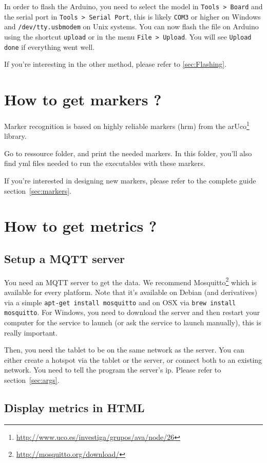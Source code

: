 \documentclass[a4paper,11pt]{report}
\begin{document}
In order to flash the Arduino, you need to select the model in \texttt{Tools >
Board} and the serial port in \texttt{Tools > Serial Port}, this is likely
\texttt{COM3} or higher on Windows and \texttt{/dev/tty.usbmodem} on Unix systems.
You can now flash the file on Arduino using the shortcut \texttt{upload} or in
the menu \texttt{File > Upload}. You will see \texttt{Upload done} if everything
went well.

If you're interesting in the other method, please refer to \ref{sec:Flashing}.

\section{How to get markers ?}

Marker recognition is based on highly reliable markers (hrm) from the
arUco\footnote{\url{http://www.uco.es/investiga/grupos/ava/node/26}}
library.

Go to ressource folder, and print the needed markers. In this folder, you'll
also find yml files needed to run the executables with these markers.

If you're interested in designing new markers, please refer to the complete guide
section~\ref{sec:markers}.

\section{How to get metrics ?}

\subsection{Setup a MQTT server}

You need an MQTT server to get the data. We recommend
Mosquitto\footnote{\url{http://mosquitto.org/download/}} which is available for
every platform. Note that it's available on Debian (and derivatives) via a
simple \texttt{apt-get install mosquitto} and on OSX via \texttt{brew install
mosquitto}. For Windows, you need to download the server and then restart your
computer for the service to launch (or ask the service to launch manually),
this is really important.

Then, you need the tablet to be on the same network as the server. You can
either create a hotspot via the tablet or the server, or connect both to an
existing network. You need to tell the program the server's ip. Please refer
to section~\ref{sec:args}.

\subsection{Display metrics in HTML}
\end{document}
